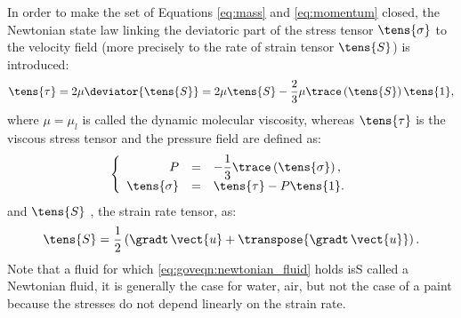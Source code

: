In order to make the set of Equations \eqref{eq:mass} and \eqref{eq:momentum} closed, the Newtonian state law
linking the deviatoric part of the stress tensor $\tens{\sigma}$ to the velocity field (more precisely to the rate of strain tensor $\tens{S}$)
is introduced: 
%
\begin{equation}\label{eq:goveqn:newtonian_fluid}
\tens{\tau}=2 \mu \deviator{\tens{S}} = 2 \mu  \tens{S}-\frac{2}{3}\mu  \trace \left(\tens{S} \right) \tens{1},
\end{equation}
%
where $\mu =\mu_l $ is called  the dynamic molecular viscosity, 
whereas $\tens{\tau}$ is the viscous stress tensor and the pressure field are defined as:
%
\begin{equation}
\left\lbrace
\begin{array}{r c l}
P &=& -\dfrac{1}{3} \trace \left( \tens{\sigma} \right), \\
\tens{\sigma} & = & \tens{\tau}-P\tens{1}.
\end{array}
\right.
\end{equation}
%
and $\tens{S}$ , the strain rate tensor, as:
\begin{equation}\label{eq:base_introd_strainrate}
 \tens{S}=\frac{1}{2} \left( \gradt \, \vect{u}+ \transpose{\gradt \, \vect{u}} \right).
\end{equation}
%
%
%
Note that a fluid for which \eqref{eq:goveqn:newtonian_fluid} holds isS called a Newtonian fluid, it is generally the case
for water, air, but not the case of a paint because the stresses do not depend linearly on the strain rate.

